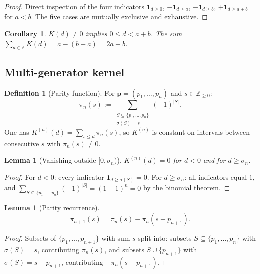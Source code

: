 \documentclass[11pt,a4paper]{amsart}
\theoremstyle{plain}
\newtheorem{lemma}[theorem]{Lemma}
\newtheorem{corollary}[theorem]{Corollary}
\theoremstyle{definition}
\newtheorem{definition}[theorem]{Definition}
\theoremstyle{remark}
\begin{document}
\begin{proof}
Direct inspection of the four indicators $\mathbf{1}_{d \geq 0}$,
$-\mathbf{1}_{d \geq a}$, $-\mathbf{1}_{d \geq b}$,
$+\mathbf{1}_{d \geq a+b}$ for $a < b$.
The five cases are mutually exclusive and exhaustive.
\end{proof}

\begin{corollary}
\label{cor:support}
$K(d) \neq 0$ implies $0 \leq d < a+b$.
The sum $\sum_{d \in \mathbb{Z}} K(d) = a - (b - a) = 2a - b$.
\end{corollary}

\subsection*{Multi-generator kernel}

\begin{definition}[Parity function]
\label{def:parity}
For $\mathbf{p} = (p_1,\ldots,p_n)$ and $s \in \mathbb{Z}_{\geq 0}$:
\[
  \pi_n(s) := \sum_{\substack{S \subseteq \{p_1,\ldots,p_n\} \\
                              \sigma(S) = s}} (-1)^{|S|}.
\]
One has $K^{(n)}(d) = \sum_{s \leq d} \pi_n(s)$,
so $K^{(n)}$ is constant on intervals between consecutive
$s$ with $\pi_n(s) \neq 0$.
\end{definition}

\begin{lemma}[Vanishing outside $[0, \sigma_n)$]
\label{lem:K-vanish}
$K^{(n)}(d) = 0$ for $d < 0$ and for $d \geq \sigma_n$.
\end{lemma}

\begin{proof}
For $d < 0$: every indicator $\mathbf{1}_{d \geq \sigma(S)} = 0$.
For $d \geq \sigma_n$: all indicators equal $1$, and
$\sum_{S \subseteq \{p_1,\ldots,p_n\}} (-1)^{|S|} = (1-1)^n = 0$
by the binomial theorem.
\end{proof}

\begin{lemma}[Parity recurrence]
\label{lem:parity-recurrence}
\[
  \pi_{n+1}(s) = \pi_n(s) - \pi_n(s - p_{n+1}).
\]
\end{lemma}

\begin{proof}
Subsets of $\{p_1,\ldots,p_{n+1}\}$ with sum $s$ split into:
subsets $S \subseteq \{p_1,\ldots,p_n\}$ with $\sigma(S) = s$,
contributing $\pi_n(s)$, and subsets $S \cup \{p_{n+1}\}$
with $\sigma(S) = s - p_{n+1}$, contributing $-\pi_n(s - p_{n+1})$.
\end{proof}
\end{document}
